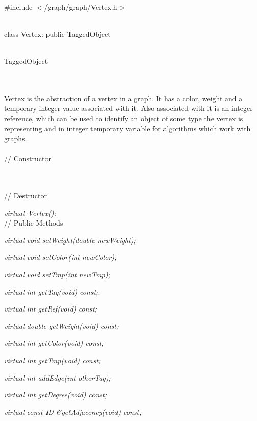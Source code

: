 
   \\
\#include $<\tilde{ }$/graph/graph/Vertex.h$>$  


  \\
class Vertex: public TaggedObject  


 \\
TaggedObject 

\indent{} \\

  \\
\indent Vertex is the abstraction of a vertex in a graph. It has a
color, weight and a temporary integer value associated with it. Also
associated with it is an integer reference, which can be used to identify
an object of some type the vertex is representing and in integer
temporary variable for algorithms which work with graphs. \\

  \\
// Constructor  

  \\\\ 
// Destructor  

{\em virtual~$\tilde{}$Vertex();}  \\

// Public Methods  

{\em virtual void setWeight(double newWeight);} 

{\em virtual void setColor(int newColor);} 

{\em virtual void setTmp(int newTmp);} 

{\em virtual int getTag(void) const;}. 

{\em virtual int getRef(void) const; } 

{\em virtual double getWeight(void) const;} 

{\em virtual int getColor(void) const; } 

{\em virtual int getTmp(void) const; } 

{\em virtual int addEdge(int otherTag); } 

{\em virtual int getDegree(void) const;} 

{\em virtual const ID \&getAdjacency(void) const;} 

